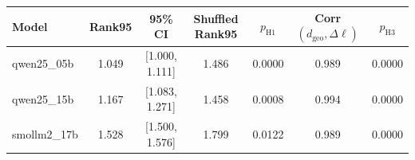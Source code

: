\begin{tabular}{lcccccc}
\toprule
Model & Rank95 & 95\% CI & Shuffled Rank95 & $p_{\mathrm{H1}}$ & Corr$(d_{\mathrm{geo}}, \Delta \ell)$ & $p_{\mathrm{H3}}$ \\
\midrule
qwen25\_05b & 1.049 & [1.000, 1.111] & 1.486 & 0.0000 & 0.989 & 0.0000 \\
qwen25\_15b & 1.167 & [1.083, 1.271] & 1.458 & 0.0008 & 0.994 & 0.0000 \\
smollm2\_17b & 1.528 & [1.500, 1.576] & 1.799 & 0.0122 & 0.989 & 0.0000 \\
\bottomrule
\end{tabular}